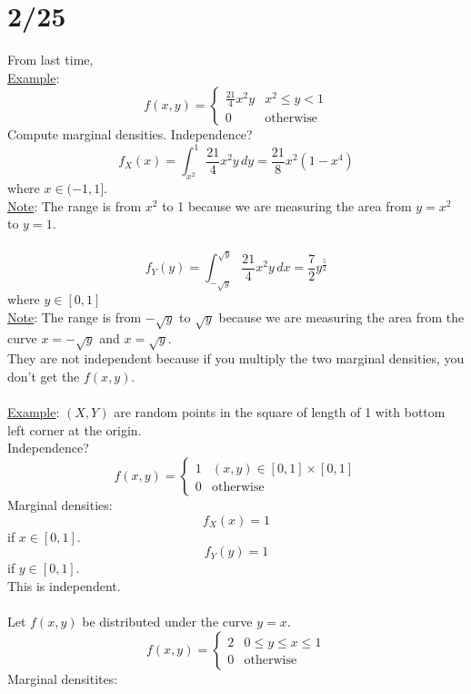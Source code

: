 \section*{2/25}
  From last time,\\
  \underline{Example}:
    $$
      f(x,y) = \begin{cases} \frac{21}{4}x^2y & x^2 \le y < 1\\ 0 & \text{
      otherwise} \end{cases}
    $$
    Compute marginal densities. Independence?\\
    $$
      f_X(x) = \int_{x^2}^1 \frac{21}{4} x^2y \, dy = \frac{21}{8} x^2(1-x^4)
    $$
    where $x \in (-1, 1]$.\\
    \underline{Note}: The range is from $x^2$ to 1 because we are measuring
    the area from $y = x^2$ to $y = 1$.\\\\
    $$
      f_Y(y) = \int_{-\sqrt{y}}^{\sqrt{y}} \frac{21}{4}x^2y\,dx = \frac{7}{2}
      y^{\frac{5}{2}}
    $$
    where $y \in [0,1]$\\
    \underline{Note}: The range is from $-\sqrt{y}$ to $\sqrt{y}$ because we 
    are measuring the area from the curve $x = -\sqrt{y}$ and $x = \sqrt{y}$.\\
    They are not independent because if you multiply the two marginal densities,
    you don't get the $f(x,y)$.\\\\
  \underline{Example}: $(X, Y)$ are random points in the square of length of 1
  with bottom left corner at the origin.\\
  Independence?\\
  $$
    f(x,y) = \begin{cases} 1 & (x,y) \in [0,1] \times [0,1]\\ 0 & 
      \text{otherwise}\end{cases}
  $$
  Marginal densities:\\
  $$
    f_X(x) = 1 
  $$
  if $x \in [0,1]$.\\
  $$
    f_Y(y) = 1
  $$
  if $y \in [0,1]$.\\
  This is independent.\\\\
  Let $f(x,y)$ be distributed under the curve $y = x$.
  $$
    f(x,y) = \begin{cases} 2 & 0 \le y \le x \le 1\\ 0 & \text{otherwise} 
      \end{cases}
  $$
  Marginal densitites:\\
